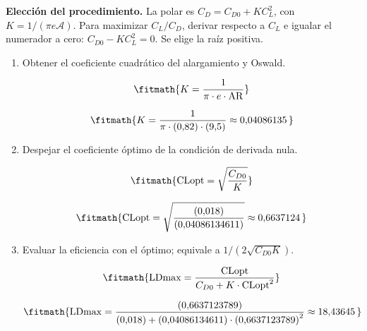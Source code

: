 \noindent\textbf{Elección del procedimiento.} La polar es $C_D=C_{D0}+KC_L^2$, con $K=1/(\pi e\mathcal A)$. Para maximizar $C_L/C_D$, derivar respecto a $C_L$ e igualar el numerador a cero: $C_{D0}-KC_L^2=0$. Se elige la raíz positiva.

\begin{enumerate}

\item Obtener el coeficiente cuadrático del alargamiento y Oswald.

\[\fitmath{K=\frac{1}{\pi\cdot e\cdot \mathrm{AR}}}\]

\[\fitmath{K=\frac{1}{\pi\cdot (0{,}82)\cdot (9{,}5)}\approx 0{,}04086135\,}\]

\item Despejar el coeficiente óptimo de la condición de derivada nula.

\[\fitmath{\mathrm{CLopt}=\sqrt{\frac{C_{D0}}{K}}}\]

\[\fitmath{\mathrm{CLopt}=\sqrt{\frac{(0{,}018)}{(0{,}04086134611)}}\approx 0{,}6637124\,}\]

\item Evaluar la eficiencia con el óptimo; equivale a $1/(2\sqrt{C_{D0}K})$.

\[\fitmath{\mathrm{LDmax}=\frac{\mathrm{CLopt}}{C_{D0}+K\cdot {\mathrm{CLopt}}^{2}}}\]

\[\fitmath{\mathrm{LDmax}=\frac{(0{,}6637123789)}{(0{,}018)+(0{,}04086134611)\cdot {(0{,}6637123789)}^{2}}\approx 18{,}43645\,}\]

\end{enumerate}

